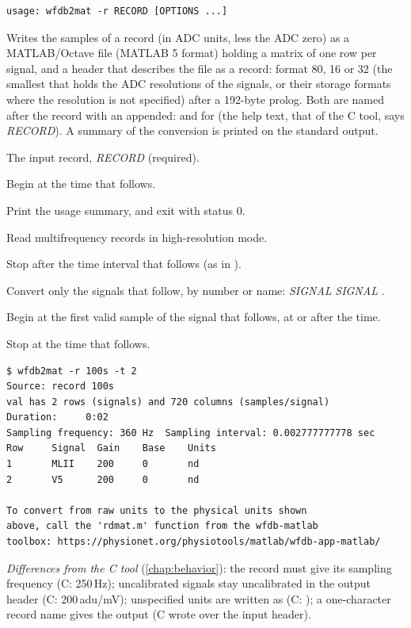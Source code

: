 \begin{lstlisting}[style=signature,language={}]
usage: wfdb2mat -r RECORD [OPTIONS ...]
\end{lstlisting}
Writes the samples of a record (in ADC units, less the ADC zero) as a MATLAB/Octave
 file (MATLAB 5 format) holding a matrix  of one row per signal, and a
header that describes the  file as a record: format 80, 16 or 32 (the smallest
that holds the ADC resolutions of the signals, or their storage formats where the resolution
is not specified) after a 192-byte prolog. Both are named after the record
with an  appended:  and  for  (the help
text, that of the C tool, says \textit{RECORD}). A summary of the conversion is
printed on the standard output.
\begin{params}
\item[-r] The input record, \textit{RECORD} (required).
\item[-f] Begin at the time that follows.
\item[-h] Print the usage summary, and exit with status 0.
\item[-H] Read multifrequency records in high-resolution mode.
\item[-l] Stop after the time interval that follows (as in ).
\item[-s] Convert only the signals that follow, by number or name:
   \textit{SIGNAL} \code{[}\textit{SIGNAL} \code{...]}.
\item[-S] Begin at the first valid sample of the signal that follows, at or after the
   time.
\item[-t] Stop at the time that follows.
\end{params}
\begin{lstlisting}[style=text]
$ wfdb2mat -r 100s -t 2
Source: record 100s
val has 2 rows (signals) and 720 columns (samples/signal)
Duration:     0:02
Sampling frequency: 360 Hz  Sampling interval: 0.002777777778 sec
Row     Signal  Gain    Base    Units
1       MLII    200     0       nd
2       V5      200     0       nd

To convert from raw units to the physical units shown
above, call the 'rdmat.m' function from the wfdb-matlab
toolbox: https://physionet.org/physiotools/matlab/wfdb-app-matlab/
\end{lstlisting}
\textit{Differences from the C tool} (\cref{chap:behavior}): the record must give its
sampling frequency (C: 250\,Hz); uncalibrated signals stay uncalibrated in the output
header (C: 200\,adu/mV); unspecified units are written as  (C: ); a
one-character record name  gives the output  (C wrote over the input
header).

